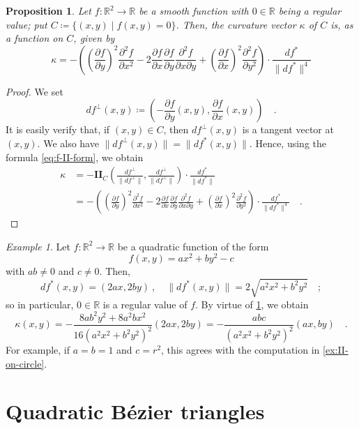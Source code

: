 \documentclass[pdftex,a4paper,12pt]{scrartcl}
\theoremstyle{plain}
\newtheorem{proposition}[theorem]{Proposition}
\theoremstyle{definition}
\theoremstyle{remark}
\newtheorem{example}[theorem]{Example}
\numberwithin{equation}{section}
\begin{document}
\begin{proposition}
\label{prop:f-curvature}
Let $f:\mathbb R^2\to\mathbb R$ be a smooth function with $0\in\mathbb R$ being a regular value; put $C\coloneqq\{(x,y)\mid f(x,y)=0\}$.
Then, the curvature vector $\kappa$ of $C$ is, as a function on $C$, given by
\[
\kappa
= -\left(
\left(\frac{\partial f}{\partial y}\right)^2\frac{\partial^2 f}{\partial x^2}
-2\frac{\partial f}{\partial x}\frac{\partial f}{\partial y}\frac{\partial^2 f}{\partial x\partial y}
+\left(\frac{\partial f}{\partial x}\right)^2\frac{\partial^2 f}{\partial y^2}
\right)\cdot
\frac{df^\ast}{\|df^\ast\|^4}
\]
\end{proposition}
\begin{proof}
We set
\[
df^\perp(x,y)
\coloneqq \left(-\frac{\partial f}{\partial y}(x,y), \frac{\partial f}{\partial x}(x,y)\right)
\quad.
\]
It is easily verify that, if $(x,y)\in C$, then $df^\perp(x,y)$ is a tangent vector at $(x,y)$.
We also have $\|df^\perp(x,y)\|=\|df^\ast(x,y)\|$.
Hence, using the formula \eqref{eq:f-II-form}, we obtain
\[
\begin{split}
\kappa
&= -\mathbf{II}_C\left(\frac{df^\perp}{\|df^\perp\|},\frac{df^\perp}{\|df^\perp\|}\right)\cdot\frac{df^\ast}{\|df^\ast\|} \\
&= -\left(
\left(\frac{\partial f}{\partial y}\right)^2\frac{\partial^2 f}{\partial x^2}
-2\frac{\partial f}{\partial x}\frac{\partial f}{\partial y}\frac{\partial^2 f}{\partial x\partial y}
+\left(\frac{\partial f}{\partial x}\right)^2\frac{\partial^2 f}{\partial y^2}
\right)\cdot
\frac{df^\ast}{\|df^\ast\|^4}
\quad.
\end{split}
\]
\end{proof}

\begin{example}
Let $f:\mathbb R^2\to\mathbb R$ be a quadratic function of the form
\[
f(x,y)=ax^2+by^2-c
\]
with $ab\neq 0$ and $c\neq 0$.
Then,
\[
df^\ast(x,y) = (2ax, 2by)
\ ,\quad
\|df^\ast(x,y)\| = 2\sqrt{a^2x^2+b^2y^2}
\quad;
\]
so in particular, $0\in\mathbb R$ is a regular value of $f$.
By virtue of \cref{prop:f-curvature}, we obtain
\[
\kappa(x,y)
= -\frac{8ab^2y^2+8a^2bx^2}{16(a^2x^2+b^2y^2)^2}(2ax,2by)
= -\frac{abc}{(a^2x^2+b^2y^2)^2}(ax,by)
\quad.
\]
For example, if $a=b=1$ and $c=r^2$, this agrees with the computation in \cref{ex:II-on-circle}.
\end{example}


\section{Quadratic B\'ezier triangles}
\label{sec:qbeztri}
\end{document}
